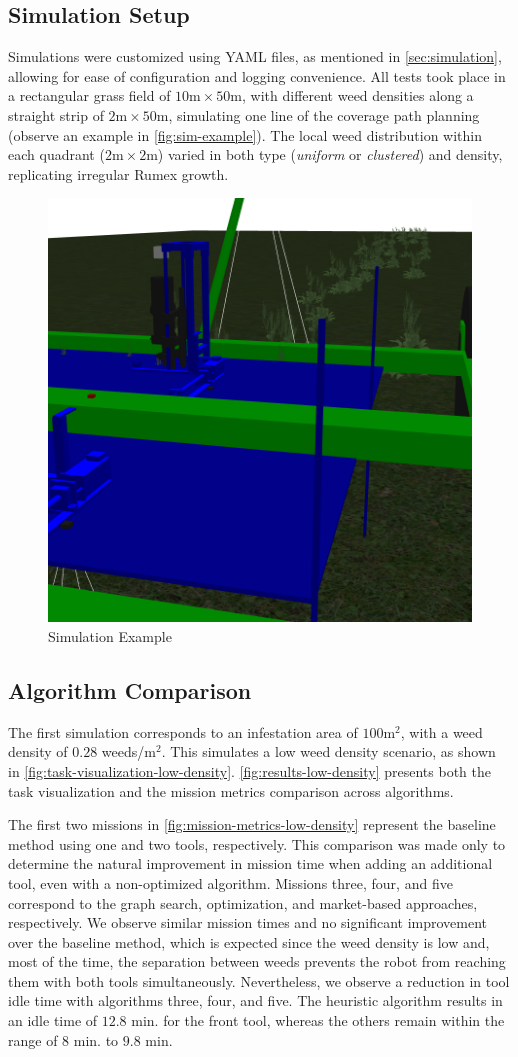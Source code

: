 \subsection{Simulation Setup}
Simulations were customized using YAML files, as mentioned in \autoref{sec:simulation}, allowing for ease of configuration and logging convenience. All tests took place in a rectangular grass field of $10\text{m} \times 50\text{m}$, with different weed densities along a straight strip of $2\text{m} \times 50\text{m}$, simulating one line of the coverage path planning (observe an example in \autoref{fig:sim-example}). The local weed distribution within each quadrant ($2\text{m} \times 2\text{m}$) varied in both type (\textit{uniform} or \textit{clustered}) and density, replicating irregular Rumex growth.

\begin{figure}[hbt]
    \centering
    \includegraphics[width=0.5\linewidth]{gfx/ch03/field_strip_path_2.png}
    \caption{Simulation Example}
    \label{fig:sim-example}
\end{figure}

\subsection{Algorithm Comparison}
The first simulation corresponds to an infestation area of $100\text{m}^2$, with a weed density of $0.28$ weeds/m$^2$. This simulates a low weed density scenario, as shown in \autoref{fig:task-visualization-low-density}. \autoref{fig:results-low-density} presents both the task visualization and the mission metrics comparison across algorithms.

The first two missions in \autoref{fig:mission-metrics-low-density} represent the baseline method using one and two tools, respectively. This comparison was made only to determine the natural improvement in mission time when adding an additional tool, even with a non-optimized algorithm. Missions three, four, and five correspond to the graph search, optimization, and market-based approaches, respectively. We observe similar mission times and no significant improvement over the baseline method, which is expected since the weed density is low and, most of the time, the separation between weeds prevents the robot from reaching them with both tools simultaneously. Nevertheless, we observe a reduction in tool idle time with algorithms three, four, and five. The heuristic algorithm results in an idle time of $12.8$ min. for the front tool, whereas the others remain within the range of $8$ min. to $9.8$ min.

